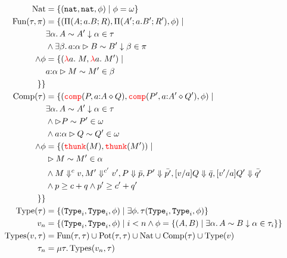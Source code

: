 \begin{align*}
  \text{Nat} &= \{(\nat,\nat,\phi) \mid \phi = \omega\}\\
  \iffalse
  \text{Pot}(\tau,\pi) &= 
    \{(\relpotty{A}{a}{B}, \relpotty{A'}{a}{B'}, \phi) \mid &\\
    &\exists \alpha.\, \sameType{A}{A'}{\alpha}{\tau} \\
    &\land\exists \beta.\, \sameTypeOne{a}{\alpha}{B}{B'}{\beta}{\pi} \\
    &\land \phi = \kappa(\alpha,a.\beta)
    \}\\
    \fi
  \text{Fun}(\tau, \pi) &=
  \{(\arrabt{A}{a.B}{R}, \arrabt{A'}{a.B'}{R'}, \phi) 
  \mid & \\
  &\exists \alpha.\, \sameType{A}{A'}{\alpha}{\tau} \\
  &\land\exists \beta.\, \sameTypeOne{a}{\alpha}{B}{B'}{\beta}{\pi} \\
  \iffalse
  &\land R \sim R' \in \kappa(\alpha, a.\beta)\\
  \fi
  \land\phi &= \{(\lam{a}{\_}{M}, \lam{a}{}{M'}) \mid \\
  &\sameComp{\isOf{a}{\alpha}}{M}{M'}{\beta}\\
  \iffalse
  &\land \fequiv{\cost{a.M}}{\cost{a.M'}}\\
  &\land \eval{R}{\relpot{a}{P}{a.b}{Q}}, \eval{R'}{\relpot{a}{P'}{a.b}{Q'}}\\
  &\land \widehat{a.P} \succeq \cost{a.M} + \{(v, \widehat{a.Q}(v,\widehat{a.M}(v))) \mid \forall v.\, \alpha(v,v)\}\\
  &\land \widehat{a.P'} \succeq \cost{a.M'} + \{(v, \widehat{a.Q'}(v,\widehat{a.M'}(v))) \mid \forall v.\, \alpha(v,v)\}
  \fi
   \}
  \}\\
  \text{Comp}(\tau) &= \{
  (\ccomp{P}{\isOf{a}{A}}{Q}, \ccomp{P'}{\isOf{a}{A'}}{Q'}, \phi) \mid \\
  &\exists \alpha.\, \sameType{A}{A'}{\alpha}{\tau}\\
  &\land \sameComp{}{P}{P'}{\omega}\\ 
  &\land \sameComp{\isOf{a}{\alpha}}{Q}{Q'}{\omega}\\
  \land\phi &= \{(\thunk{M}, \thunk{M'}) \mid \\
  &\sameComp{}{M}{M'}{\alpha}\\
  &\land \evalCost{M}{c}{v}, \evalCost{M'}{c'}{v'}, \eval{P}{\bar{p}},  
    \eval{P'}{\bar{p'}}, \eval{[v/a]Q}{\bar{q}}, \eval{[v'/a]Q'}{\bar{q'}}\\
  &\land p \ge c + q \land p' \ge c' + q'\\
  \}
  \}\\
  \text{Type}(\tau) &= \{(\type{i}, \type{i}, \phi) \mid \exists \phi.\, \tau(\type{i}, \type{i}, \phi)\}\\
  v_n &= \{(\type{i}, \type{i}, \phi) \mid i < n \land \phi = \{(A,B) 
  \mid \exists \alpha.\, \sameType{A}{B}{\alpha}{\tau_i}\}\}\\
  \text{Types}(v,\tau) &= \text{Fun}(\tau,\tau) \cup \text{Pot}(\tau,\tau) \cup \text{Nat} \cup \text{Comp}(\tau) \cup \text{Type}(v)\\
  \tau_n &= \mu \tau.\, \text{Types}(v_n,\tau)
\end{align*}

